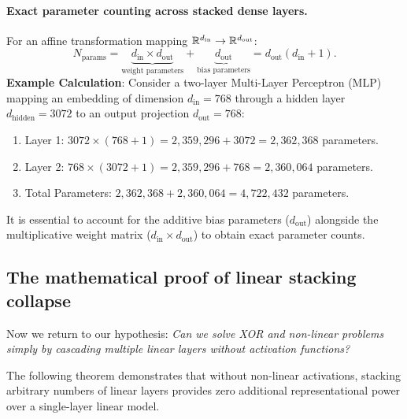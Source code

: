 \documentclass[../../main.tex]{subfiles}
\begin{document}
\paragraph{Exact parameter counting across stacked dense layers.}
For an affine transformation mapping $\mathbb{R}^{d_{\text{in}}} \to \mathbb{R}^{d_{\text{out}}}$:
\begin{equation}
\label{eq:param_count_formula}
N_{\text{params}} = \underbrace{d_{\text{in}} \times d_{\text{out}}}_{\text{weight parameters}} + \underbrace{d_{\text{out}}}_{\text{bias parameters}} = d_{\text{out}}(d_{\text{in}} + 1).
\end{equation}
\textbf{Example Calculation}: Consider a two-layer Multi-Layer Perceptron (MLP) mapping an embedding of dimension $d_{\text{in}} = 768$ through a hidden layer $d_{\text{hidden}} = 3072$ to an output projection $d_{\text{out}} = 768$:
\begin{enumerate}
    \item Layer 1: $3072 \times (768 + 1) = 2{,}359{,}296 + 3072 = 2{,}362{,}368$ parameters.
    \item Layer 2: $768 \times (3072 + 1) = 2{,}359{,}296 + 768 = 2{,}360{,}064$ parameters.
    \item Total Parameters: $2{,}362{,}368 + 2{,}360{,}064 = 4{,}722{,}432$ parameters.
\end{enumerate}
It is essential to account for the additive bias parameters ($d_{\text{out}}$) alongside the multiplicative weight matrix ($d_{\text{in}} \times d_{\text{out}}$) to obtain exact parameter counts.

\subsection{The mathematical proof of linear stacking collapse}
Now we return to our hypothesis: \emph{Can we solve XOR and non-linear problems simply by cascading multiple linear layers without activation functions?}

The following theorem demonstrates that without non-linear activations, stacking arbitrary numbers of linear layers provides zero additional representational power over a single-layer linear model.
\end{document}
